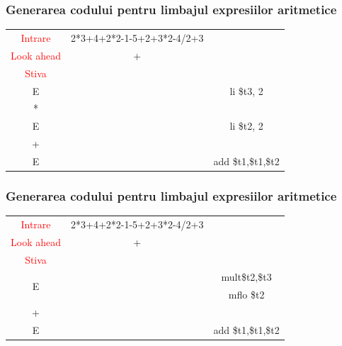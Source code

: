 \documentclass[pdf]{beamer}
\begin{document}
\begin{frame}
\frametitle{Generarea codului pentru limbajul expresiilor aritmetice}
\begin{center}
\begin{tabular}{cc|c|} \cline{1-2}
\multicolumn{1}{|c|}{\textcolor{red}{Intrare}} & {2*3+4+2*2-1-5+2+3*2-4/2+3} \\ \cline{1-2}
\multicolumn{1}{|c|}{\textcolor{red}{Look ahead}} & + \\ \cline{1-2}
\multicolumn{1}{|c|}{\textcolor{red}{Stiva}}  \\
\cline{1-1} \cline{3-3}
\multicolumn{1}{|c|}{E} & & {li \quad \$t3, 2}\\
\cline{1-1} \cline{3-3}
\multicolumn{1}{|c|}{*} & & {}\\
\cline{1-1} \cline{3-3}
\multicolumn{1}{|c|}{E} & & {li \quad \$t2, 2}\\
\cline{1-1} \cline{3-3}
\multicolumn{1}{|c|}{+} & & {}\\
\cline{1-1} \cline{3-3}
\multicolumn{1}{|c|}{E} & & {add \quad \$t1,\$t1,\$t2}\\
\cline{1-1} \cline{3-3}
\end{tabular}
\end{center}
\end{frame}



\begin{frame}
\frametitle{Generarea codului pentru limbajul expresiilor aritmetice}
\begin{center}
\begin{tabular}{cc|c|} \cline{1-2}
\multicolumn{1}{|c|}{\textcolor{red}{Intrare}} & {2*3+4+2*2-1-5+2+3*2-4/2+3} \\ \cline{1-2}
\multicolumn{1}{|c|}{\textcolor{red}{Look ahead}} & + \\ \cline{1-2}
\multicolumn{1}{|c|}{\textcolor{red}{Stiva}}  \\
\cline{1-1} \cline{3-3}
\multicolumn{1}{|c|}{\multirow{2}{*}{E}} & & { mult\quad \$t2,\$t3 }\\
\multicolumn{1}{|c|}{} & & { mflo \quad \$t2} \\
\cline{1-1} \cline{3-3} 
\multicolumn{1}{|c|}{+} & & {}\\
\cline{1-1} \cline{3-3}
\multicolumn{1}{|c|}{E} & & {add \quad \$t1,\$t1,\$t2}\\
\cline{1-1} \cline{3-3}
\end{tabular}
\end{center}
\end{frame}
\end{document}
